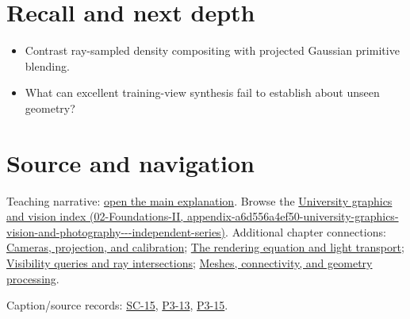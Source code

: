 \section{Recall and next depth}\label{appendix-c5b332e400e7-recall-and-next-depth}

\begin{itemize}
\tightlist
\item
  Contrast ray-sampled density compositing with projected Gaussian primitive blending.
\item
  What can excellent training-view synthesis fail to establish about unseen geometry?
\end{itemize}

\section{Source and navigation}\label{appendix-c5b332e400e7-source-and-navigation}

Teaching narrative: \href{Continuous\%20Notes/University\%20-\%20Worlds,\%20Images\%20and\%20Inference\%20-\%20Graphics,\%20Vision\%20and\%20Photography\#Learned\%20representations\%20of\%203D\%20shape\%20and\%20scenes}{open the main explanation}. Browse the \href{../02-Foundations-II/main.pdf\#nameddest=appendix-a6d556a4ef50-university-graphics-vision-and-photography---independent-series}{University graphics and vision index (02-Foundations-II, appendix-a6d556a4ef50-university-graphics-vision-and-photography-\/-\/-independent-series)}. Additional chapter connections: \href{Continuous\%20Notes/University\%20-\%20Worlds,\%20Images\%20and\%20Inference\%20-\%20Graphics,\%20Vision\%20and\%20Photography\#Cameras,\%20projection,\%20and\%20calibration}{Cameras, projection, and calibration}; \href{Continuous\%20Notes/University\%20-\%20Worlds,\%20Images\%20and\%20Inference\%20-\%20Graphics,\%20Vision\%20and\%20Photography\#The\%20rendering\%20equation\%20and\%20light\%20transport}{The rendering equation and light transport}; \href{Continuous\%20Notes/University\%20-\%20Worlds,\%20Images\%20and\%20Inference\%20-\%20Graphics,\%20Vision\%20and\%20Photography\#Visibility\%20queries\%20and\%20ray\%20intersections}{Visibility queries and ray intersections}; \href{Continuous\%20Notes/University\%20-\%20Worlds,\%20Images\%20and\%20Inference\%20-\%20Graphics,\%20Vision\%20and\%20Photography\#Meshes,\%20connectivity,\%20and\%20geometry\%20processing}{Meshes, connectivity, and geometry processing}.

Caption/source records: \href{Continuous\%20Notes/University\%20-\%20Worlds,\%20Images\%20and\%20Inference\%20-\%20Graphics,\%20Vision\%20and\%20Photography\#SC-15\%20-\%20Stanford\%20CS231N\%20Deep\%20Learning\%20for\%20Computer\%20Vision\%20Spring\%202025\%20Lecture\%2015:\%203D\%20Vision}{SC-15}, \href{Continuous\%20Notes/University\%20-\%20Worlds,\%20Images\%20and\%20Inference\%20-\%20Graphics,\%20Vision\%20and\%20Photography\#P3-13\%20-\%20Curves\%20and\%20Surfaces}{P3-13}, \href{Continuous\%20Notes/University\%20-\%20Worlds,\%20Images\%20and\%20Inference\%20-\%20Graphics,\%20Vision\%20and\%20Photography\#P3-15\%20-\%20Ray\%20Tracing}{P3-15}.
